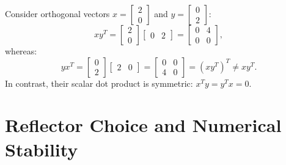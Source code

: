 \begin{example}
Consider orthogonal vectors $x = \begin{bmatrix} 2 \\ 0 \end{bmatrix}$ and $y = \begin{bmatrix} 0 \\ 2 \end{bmatrix}$:
\begin{equation}
    x y^T = \begin{bmatrix} 2 \\ 0 \end{bmatrix} \begin{bmatrix} 0 & 2 \end{bmatrix} = \begin{bmatrix} 0 & 4 \\ 0 & 0 \end{bmatrix},
\end{equation}
whereas:
\begin{equation}
    y x^T = \begin{bmatrix} 0 \\ 2 \end{bmatrix} \begin{bmatrix} 2 & 0 \end{bmatrix} = \begin{bmatrix} 0 & 0 \\ 4 & 0 \end{bmatrix} = (x y^T)^T \neq x y^T.
\end{equation}
In contrast, their scalar dot product is symmetric: $x^T y = y^T x = 0$.
\end{example}

\FloatBarrier
\section{Reflector Choice and Numerical Stability}
\label{sec:reflector-choice-stability-en}

